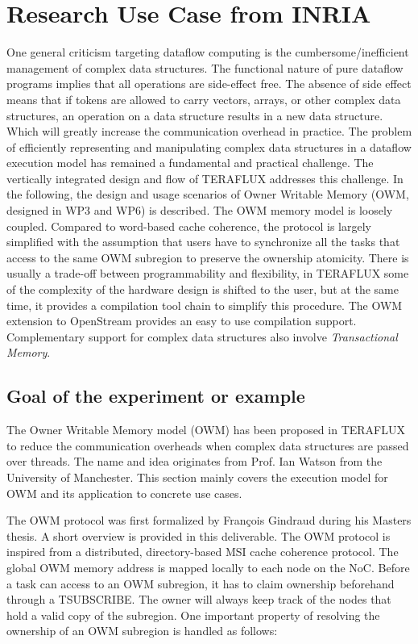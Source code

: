 \documentclass[a4paper]{article}
\begin{document}
\section[Research Use Case from INRIA]{Research Use Case from INRIA}
\label{bkm:Ref388223343}{
One general criticism targeting dataflow computing is the
cumbersome/inefficient management of complex data structures. The
functional nature of pure dataflow programs implies that all operations
are side-effect free. The absence of side effect means that if tokens
are allowed to carry vectors, arrays, or other complex data structures,
an operation on a data structure results in a new data structure. Which
will greatly increase the communication overhead in practice. The
problem of efficiently representing and manipulating complex data
structures in a dataflow execution model has remained a fundamental and
practical challenge. The vertically integrated design and flow of
TERAFLUX addresses this challenge. In the following, the design and
usage scenarios of Owner Writable Memory (OWM, designed in WP3 and WP6)
is described. The OWM memory model is loosely coupled. Compared to
word-based cache coherence, the protocol is largely simplified with the
assumption that users have to synchronize all the tasks that access to
the same OWM subregion to preserve the ownership atomicity. There is
usually a trade-off between programmability and flexibility, in
TERAFLUX some of the complexity of the hardware design is shifted to
the user, but at the same time, it provides a compilation tool chain to
simplify this procedure. The OWM extension to OpenStream provides an
easy to use compilation support. Complementary support for complex data
structures also involve \textit{Transactional Memory}.}

\subsection[Goal of the experiment or example]{Goal of the experiment or
example}
{
The Owner Writable Memory model (OWM) has been proposed in TERAFLUX to
reduce the communication overheads when complex data structures are
passed over threads. The name and idea originates from Prof. Ian Watson
from the University of Manchester. This section mainly covers the
execution model for OWM and its application to concrete use cases.}

{
The OWM protocol was first formalized by Fran\c{c}ois Gindraud during
his Master{\textquotesingle}s thesis. A short overview is provided in
this deliverable. The OWM protocol is inspired from a distributed,
directory-based MSI cache coherence protocol. The global OWM memory
address is mapped locally to each node on the NoC. Before a task can
access to an OWM subregion, it has to claim ownership beforehand
through a TSUBSCRIBE. The owner will always keep track of the nodes
that hold a valid copy of the subregion. One important property of
resolving the ownership of an OWM subregion is handled as follows:}
\end{document}
